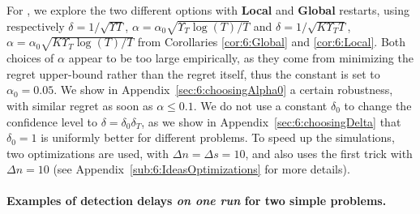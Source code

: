 
For \GLRklUCB, we explore the two different options with \textbf{Local} and \textbf{Global} restarts,
using respectively
$\delta = 1/\sqrt{\Upsilon T}$, $\alpha = \alpha_0 \sqrt{\Upsilon_T \log(T) /T}$
and
$\delta = 1/\sqrt{K \Upsilon_T T}$, $\alpha = \alpha_0\sqrt{K \Upsilon_T \log(T) / T}$
from Corollaries \ref{cor:6:Global} and \ref{cor:6:Local}.
Both choices of $\alpha$ appear to be too large empirically, as they come from minimizing the regret upper-bound rather than the regret itself, thus
the constant is set to $\alpha_0 = 0.05$.
We show in Appendix~\ref{sec:6:choosingAlpha0} a certain robustness, with similar regret as soon as $\alpha\leq0.1$.
We do not use a constant $\delta_0$ to change the confidence level to $\delta = \delta_0 \delta_T$, as we show in Appendix~\ref{sec:6:choosingDelta} that $\delta_0=1$ is uniformly better for different problems.
%
To speed up the simulations, two optimizations are used, with $\Delta n = \Delta s = 10$,
and \CUSUM{} also uses the first trick with $\Delta n = 10$ (see Appendix~\ref{sub:6:IdeasOptimizations} for more details).

%


\paragraph{Examples of detection delays \emph{on one run} for two simple problems.}

